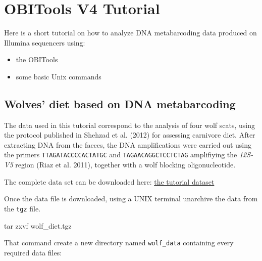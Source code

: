 \documentclass[
  letterpaper,
  DIV=11,
  numbers=noendperiod]{scrreprt}
\newenvironment{Shaded}{\begin{snugshade}}{\end{snugshade}}
\newcommand{\FunctionTok}[1]{\textcolor[rgb]{0.28,0.35,0.67}{#1}}
\newcommand{\NormalTok}[1]{\textcolor[rgb]{0.00,0.23,0.31}{#1}}
\providecommand{\tightlist}{%
  \setlength{\itemsep}{0pt}\setlength{\parskip}{0pt}}\usepackage{longtable,booktabs,array}
\begin{document}
\hypertarget{obitools-v4-tutorial}{%
\chapter{OBITools V4 Tutorial}\label{obitools-v4-tutorial}}

Here is a short tutorial on how to analyze DNA metabarcoding data
produced on Illumina sequencers using:

\begin{itemize}
\tightlist
\item
  the OBITools
\item
  some basic Unix commands
\end{itemize}

\hypertarget{wolves-diet-based-on-dna-metabarcoding}{%
\section{Wolves' diet based on DNA
metabarcoding}\label{wolves-diet-based-on-dna-metabarcoding}}

The data used in this tutorial correspond to the analysis of four wolf
scats, using the protocol published in Shehzad et al. (2012) for
assessing carnivore diet. After extracting DNA from the faeces, the DNA
amplifications were carried out using the primers
\texttt{TTAGATACCCCACTATGC} and \texttt{TAGAACAGGCTCCTCTAG} amplifiying
the \emph{12S-V5} region (Riaz et al. 2011), together with a wolf
blocking oligonucleotide.

The complete data set can be downloaded here: \href{wolf_diet.tgz}{the
tutorial dataset}

Once the data file is downloaded, using a UNIX terminal unarchive the
data from the \texttt{tgz} file.

\begin{Shaded}
\begin{Highlighting}[]
\FunctionTok{tar}\NormalTok{ zxvf wolf\_diet.tgz}
\end{Highlighting}
\end{Shaded}

That command create a new directory named \texttt{wolf\_data} containing
every required data files:
\end{document}

